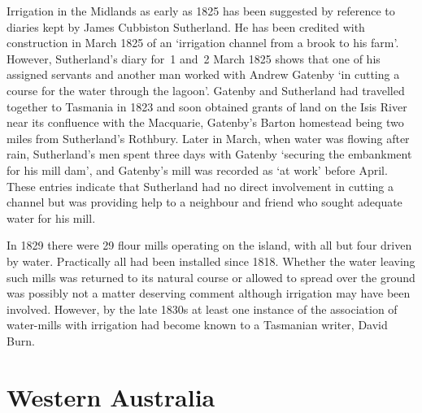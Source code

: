 Irrigation in the Midlands as early as 1825 has been suggested by
reference to diaries kept by James Cubbiston Sutherland. He has been
credited with construction in March 1825 of an `irrigation channel
from a brook to his farm'. However, Sutherland's diary for~1 and~2
March 1825 shows that one of his assigned servants and another man
worked with Andrew Gatenby `in cutting a course for the water through
the lagoon'.  Gatenby and Sutherland had travelled together to
Tasmania in 1823 and soon obtained grants of land on the Isis River
near its confluence with the Macquarie, Gatenby's Barton homestead
being two miles from Sutherland's Rothbury.  Later in March, when
water was flowing after rain, Sutherland's men spent three days with
Gatenby `securing the embankment for his mill dam', and Gatenby's mill
was recorded as `at work' before April.  These entries indicate that
Sutherland had no direct involvement in cutting a channel but was
providing help to a neighbour and friend who sought adequate water for
his mill.

In 1829 there were 29 flour mills operating on the island, with all
but four driven by water.  Practically all had been installed since
1818.  Whether the water leaving such mills was returned to its
natural course or allowed to spread over the ground was possibly not a
matter deserving comment although irrigation may have been
involved. However, by the late 1830s at least one instance of the
association of water-mills with irrigation had become known to a
Tasmanian writer, David Burn.

\section*{Western Australia}

